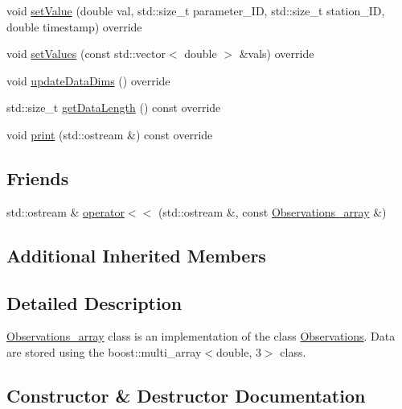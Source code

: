 \begin{DoxyCompactItemize}
\item 
void \mbox{\hyperlink{class_observations__array_a3994f0e11a8207c5e1182a9b20a67ec4}{set\+Value}} (double val, std\+::size\+\_\+t parameter\+\_\+\+ID, std\+::size\+\_\+t station\+\_\+\+ID, double timestamp) override
\item 
void \mbox{\hyperlink{class_observations__array_ae4ed49512506eae597a158d4c87dbd31}{set\+Values}} (const std\+::vector$<$ double $>$ \&vals) override
\item 
void \mbox{\hyperlink{class_observations__array_aa9364c4356d1f8a2b430c93a1fcd021f}{update\+Data\+Dims}} () override
\item 
std\+::size\+\_\+t \mbox{\hyperlink{class_observations__array_ae535b742be4ea895117da607fbe7c702}{get\+Data\+Length}} () const override
\item 
void \mbox{\hyperlink{class_observations__array_a2563545e5a38ec7e3ec09380c0b38855}{print}} (std\+::ostream \&) const override
\end{DoxyCompactItemize}
\subsection*{Friends}
\begin{DoxyCompactItemize}
\item 
std\+::ostream \& \mbox{\hyperlink{class_observations__array_affb01c6a2af2ae2b833f7edec435234d}{operator$<$$<$}} (std\+::ostream \&, const \mbox{\hyperlink{class_observations__array}{Observations\+\_\+array}} \&)
\end{DoxyCompactItemize}
\subsection*{Additional Inherited Members}


\subsection{Detailed Description}
\mbox{\hyperlink{class_observations__array}{Observations\+\_\+array}} class is an implementation of the class \mbox{\hyperlink{class_observations}{Observations}}. Data are stored using the boost\+::multi\+\_\+array$<$double, 3$>$ class. 

\subsection{Constructor \& Destructor Documentation}
\mbox{\label{class_observations__array_ad161de2b3dd6537a040c2dbda002ccaf}} 
